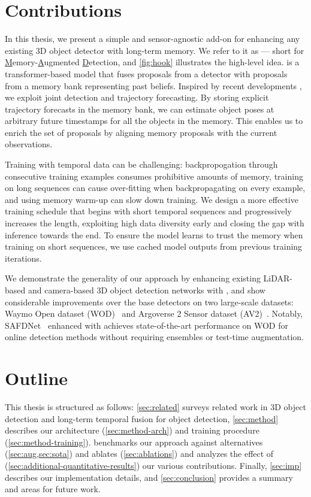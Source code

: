 \section{Contributions}

In this thesis, we present a simple and sensor-agnostic
add-on for enhancing any existing 3D object detector with long-term memory. We refer to it as \ourmodel{} --- short for \underline{M}emory-\underline{A}ugmented \underline{D}etection, and \cref{fig:hook} illustrates the high-level idea.
\ourmodel{} is a transformer-based model that fuses proposals from a detector with proposals from a memory bank representing past beliefs.
Inspired by recent developments \cite{casas2024detra}, we exploit joint detection and trajectory forecasting.
By storing explicit trajectory forecasts in the memory bank, we can estimate object poses at arbitrary future timestamps for all the objects in the memory.
This enables us to enrich the set of proposals by aligning memory proposals with the current observations.

Training with temporal data can be challenging:
backpropogation through consecutive training examples consumes prohibitive amounts of memory,
training on long sequences can cause over-fitting when backpropagating on every example,
and using memory warm-up can slow down training.
We design a more effective training schedule that begins with short temporal sequences and progressively increases the length, exploiting high data diversity early and closing the gap with inference towards the end.
To ensure the model learns to trust the memory when training on short sequences,
we use cached model outputs from previous training iterations.%

We demonstrate the generality of our approach by enhancing existing LiDAR-based and camera-based 3D object detection networks with \ourmodel{}, and show considerable improvements over the base detectors on two large-scale datasets: Waymo Open dataset (WOD)~\cite{WOD} and  Argoverse 2 Sensor dataset (AV2)~\cite{wilson2023argoverse}.
Notably, SAFDNet~\cite{safdnet} enhanced with \ourmodel{} achieves state-of-the-art performance on WOD for online detection methods without requiring ensembles or test-time augmentation.

\section{Outline}

This thesis is structured as follows: \cref{sec:related} surveys related work
in 3D object detection and long-term temporal fusion for object detection, 
\cref{sec:method} describes our architecture (\cref{sec:method-arch}) and
training procedure (\cref{sec:method-training}).
 benchmarks our approach against alternatives
(\cref{sec:aug,sec:sota}) and ablates (\cref{sec:ablations}) and
analyzes the effect of (\cref{sec:additional-quantitative-results})
our various contributions. Finally, \cref{sec:imp} describes our implementation details,
and \cref{sec:conclusion} provides a summary and areas for future work.
